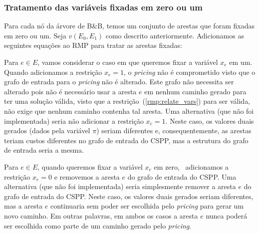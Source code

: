\subsubsection{Tratamento das variáveis fixadas em zero ou um}
Para cada nó da árvore de B\&B, temos um conjunto de arestas que foram
fixadas em zero ou um.  Seja $v(E_0, E_1)$ como descrito
anteriormente. Adicionamos as seguintes equações ao RMP para tratar as
arestas fixadas:

\begin{lpformulation}[]
\end{lpformulation}

Para $e \in E$, vamos considerar o caso em que queremos fixar a
variável $x_e$ em um.  Quando adicionamos a restrição $x_e = 1$, o
\emph{pricing} não é comprometido visto que o grafo de entrada para o
\emph{pricing} não é alterado. Este grafo não necessita ser alterado
pois não é necessário usar a aresta $e$ em nenhum caminho gerado para
ter uma solução válida, visto que a restrição~(\ref{rmp:relate_vars})
para ser válida, não exige que nenhum caminho contenha tal aresta. Uma
alternativa (que não foi implementada) seria não adicionar a restrição
$x_e = 1$. Neste caso, os valores duais gerados (dados pela variável
$\pi$) seriam diferentes e, consequentemente, as arestas teriam custos
diferentes no grafo de entrada do CSPP, mas a estrutura do grafo de
entrada seria a mesma.

  Para $e \in E$, quando queremos fixar a variável $x_e$ em zero, \
  adicionamos a restrição $x_e = 0$ e removemos a aresta $e$ do
  grafo de entrada do CSPP. Uma alternativa (que não foi implementada)
  seria simplesmente remover a aresta $e$ do grafo de entrada do
  CSPP. Neste caso, os valores duais gerados seriam diferentes, mas a
  aresta $e$ continuaria sem poder ser escolhida pelo \emph{pricing}
  para gerar um novo caminho. Em outras palavras, em ambos os casos a
  aresta $e$ nunca poderá ser escolhida como parte de um caminho
  gerado pelo \emph{pricing}.


